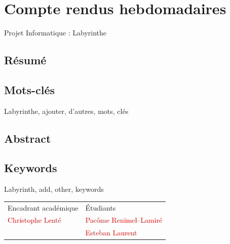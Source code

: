 \documentclass[12pt]{scrreprt} %
\begin{document}
\newpage %
\renewcommand{\bibname}{Bibliographie} %


\chapter*{Compte rendus hebdomadaires}



\newpage

\begin{center}
    \Huge
    Projet Informatique : Labyrinthe
\end{center}

\section*{Résumé}

\blindtext

\section*{Mots-clés}

Labyrinthe, ajouter, d'autres, mots, clés

\section*{Abstract}
\blindtext

\section*{Keywords}

Labyrinth, add, other, keywords

\hrulefill

\vfill


\begin{table}[h]
    \begin{tabularx}{\textwidth}{|X|Y|}
        \hline
        Encadrant académique              & Étudiants                               \\
        \textcolor{red}{Christophe Lenté} & \textcolor{red}{Pacôme Renimel--Lamiré} \\
                                          & \textcolor{red}{Esteban Laurent}        \\
        \hline
    \end{tabularx}
\end{table}
\end{document}
